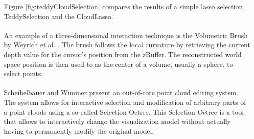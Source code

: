 Figure \ref{fig:teddyCloudSelection} compares the results of a simple lasso selection, TeddySelection and the CloudLasso. 
\\
\\
An example of a three-dimensional interaction technique is the Volumetric Brush by Weyrich et al. \cite{weyrich2004post}. The brush follows the local curvature by retrieving the current depth value for the cursor's position from the zBuffer. The reconstructed world space position is then used to as the center of a volume, usually a sphere, to select points. 
\\
\\
Scheibelbauer and Wimmer \cite{scheiblauer2011out} present an out-of-core point cloud editing system. The system allows for interactive selection and modification of arbitrary parts of a point clouds using a so-called Selection Octree. This Selection Octree is a tool that allows to interactively change the visualization model without actually having to permanently modify the original model. 

